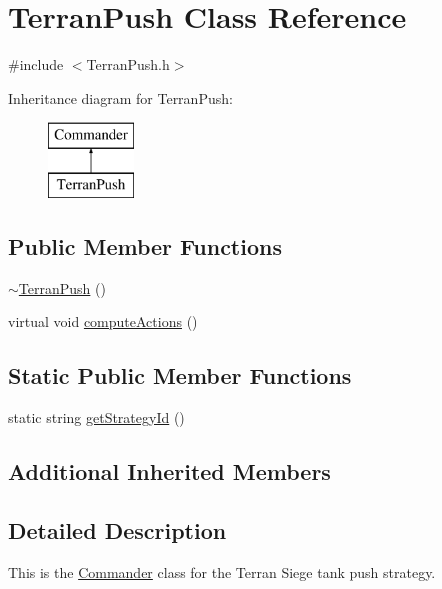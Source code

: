 \hypertarget{class_terran_push}{\section{Terran\-Push Class Reference}
\label{class_terran_push}
}


{\ttfamily \#include $<$Terran\-Push.\-h$>$}

Inheritance diagram for Terran\-Push\-:\begin{figure}[H]
\begin{center}
\leavevmode
\includegraphics[height=2.000000cm]{class_terran_push}
\end{center}
\end{figure}
\subsection*{Public Member Functions}
\begin{DoxyCompactItemize}
\item 
\hyperlink{class_terran_push_a2e67e717f441f633366e5eb6cce84c29}{$\sim$\-Terran\-Push} ()
\item 
virtual void \hyperlink{class_terran_push_a2ef2f4555684c24d95804e37ff801f2a}{compute\-Actions} ()
\end{DoxyCompactItemize}
\subsection*{Static Public Member Functions}
\begin{DoxyCompactItemize}
\item 
static string \hyperlink{class_terran_push_a68fd18c7930ad705869f3537e68dd503}{get\-Strategy\-Id} ()
\end{DoxyCompactItemize}
\subsection*{Additional Inherited Members}


\subsection{Detailed Description}
This is the \hyperlink{class_commander}{Commander} class for the Terran Siege tank push strategy.

